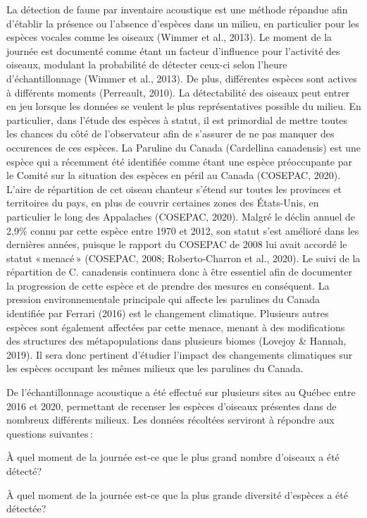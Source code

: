 \documentclass[9pt,twocolumn,twoside,]{pnas-new}
\begin{document}
La détection de faune par inventaire acoustique est une méthode répandue
afin d'établir la présence ou l'absence d'espèces dans un milieu, en
particulier pour les espèces vocales comme les oiseaux (Wimmer et al.,
2013). Le moment de la journée est documenté comme étant un facteur
d'influence pour l'activité des oiseaux, modulant la probabilité de
détecter ceux-ci selon l'heure d'échantillonnage (Wimmer et al., 2013).
De plus, différentes espèces sont actives à différents moments
(Perreault, 2010). La détectabilité des oiseaux peut entrer en jeu
lorsque les données se veulent le plus représentatives possible du
milieu. En particulier, dans l'étude des espèces à statut, il est
primordial de mettre toutes les chances du côté de l'observateur afin de
s'assurer de ne pas manquer des occurences de ces espèces. La Paruline
du Canada (Cardellina canadensis) est une espèce qui a récemment été
identifiée comme étant une espèce préoccupante par le Comité sur la
situation des espèces en péril au Canada (COSEPAC, 2020). L'aire de
répartition de cet oiseau chanteur s'étend sur toutes les provinces et
territoires du pays, en plus de couvrir certaines zones des États-Unis,
en particulier le long des Appalaches (COSEPAC, 2020). Malgré le déclin
annuel de 2,9\% connu par cette espèce entre 1970 et 2012, son statut
s'est amélioré dans les dernières années, puisque le rapport du COSEPAC
de 2008 lui avait accordé le statut «\,menacé\,» (COSEPAC, 2008;
Roberto-Charron et al., 2020). Le suivi de la répartition de C.
canadensis continuera donc à être essentiel afin de documenter la
progression de cette espèce et de prendre des mesures en conséquent. La
pression environnementale principale qui affecte les parulines du Canada
identifiée par Ferrari (2016) est le changement climatique. Plusieurs
autres espèces sont également affectées par cette menace, menant à des
modifications des structures des métapopulations dans plusieurs biomes
(Lovejoy \& Hannah, 2019). Il sera donc pertinent d'étudier l'impact des
changements climatiques sur les espèces occupant les mêmes milieux que
les parulines du Canada.

De l'échantillonnage acoustique a été effectué sur plusieurs sites au
Québec entre 2016 et 2020, permettant de recenser les espèces d'oiseaux
présentes dans de nombreux différents milieux. Les données récoltées
serviront à répondre aux questions suivantes\,:

À quel moment de la journée est-ce que le plus grand nombre d'oiseaux a
été détecté?

À quel moment de la journée est-ce que la plus grande diversité
d'espèces a été détectée?
\end{document}
